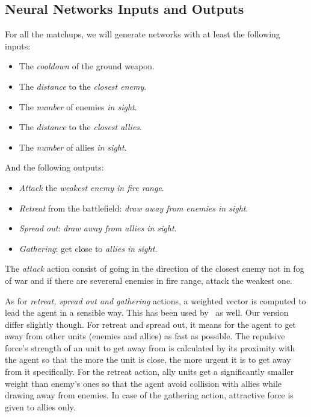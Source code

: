 \subsection{Neural Networks Inputs and Outputs}

For all the matchups, we will generate networks with at least the
following inputs:
\begin{itemize}
    \item The \emph{cooldown} of the ground weapon.
    \item The \emph{distance} to the \emph{closest enemy}.
    \item The \emph{number} of enemies \emph{in sight}.
    \item The \emph{distance} to the \emph{closest allies}.
    \item The \emph{number} of allies \emph{in sight}.
\end{itemize}

And the following outputs:
\begin{itemize}
    \item \emph{Attack} the \emph{weakest enemy in fire range}.
    \item \emph{Retreat} from the battlefield: \emph{draw away from enemies in sight}.
    \item \emph{Spread out}: \emph{draw away from allies in sight}.
    \item \emph{Gathering}: get close to \emph{allies in sight}.
\end{itemize}

The \emph{attack} action consist of going in the direction of the closest enemy not in fog of war
and if there are severeral enemies in fire range, attack the weakest one.

As for \emph{retreat, spread out and gathering} actions, a weighted vector is computed
to lead the agent in a sensible way. This has been used by~\cite{Shantia11ConnectionistSC, Wender12ReinforcementMicroSC, Zhen13NeuroEvoSC} as well.
Our version differ slightly though. For retreat and spread out, it means for the agent to
get away from other units (enemies and allies) as fast as possible. The repulsive force's strength of an unit to
get away from is calculated by its proximity with the agent so that the more the unit is close,
the more urgent it is to get away from it specifically. For the retreat action, ally units
get a significantly smaller weight than enemy's ones so that the agent avoid collision with
allies while drawing away from enemies.
In case of the gathering action, attractive force is given to allies only.

